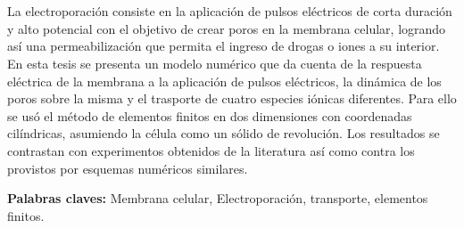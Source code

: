\chapter*{\runtitulo}

\noindent 
La electroporación consiste en la aplicación de pulsos eléctricos de corta duración y alto potencial con el objetivo de crear poros en la membrana celular, logrando así una permeabilización que permita el ingreso de drogas o iones a su interior. En esta tesis se presenta un modelo numérico que da cuenta de la respuesta eléctrica de la membrana a la aplicación de pulsos eléctricos, la dinámica de los poros sobre la misma y el trasporte de cuatro especies iónicas diferentes. Para ello se usó el método de elementos finitos en dos dimensiones con coordenadas cilíndricas, asumiendo la célula como un sólido de revolución.
Los resultados se contrastan con experimentos obtenidos de la literatura así como contra los provistos por  esquemas numéricos similares.

\bigskip

\noindent\textbf{Palabras claves:} Membrana celular, Electroporación, transporte, elementos finitos.